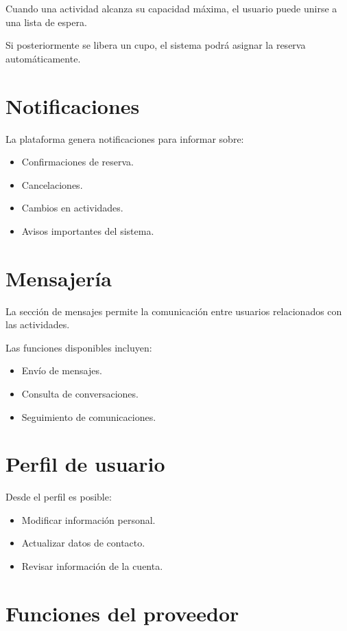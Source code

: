 \documentclass[12pt,a4paper]{article}
\begin{document}
Cuando una actividad alcanza su capacidad máxima, el usuario puede unirse a una lista de espera.

Si posteriormente se libera un cupo, el sistema podrá asignar la reserva automáticamente.

\section{Notificaciones}

La plataforma genera notificaciones para informar sobre:

\begin{itemize}
\item Confirmaciones de reserva.
\item Cancelaciones.
\item Cambios en actividades.
\item Avisos importantes del sistema.
\end{itemize}

\section{Mensajería}

La sección de mensajes permite la comunicación entre usuarios relacionados con las actividades.

Las funciones disponibles incluyen:

\begin{itemize}
\item Envío de mensajes.
\item Consulta de conversaciones.
\item Seguimiento de comunicaciones.
\end{itemize}

\section{Perfil de usuario}

Desde el perfil es posible:

\begin{itemize}
\item Modificar información personal.
\item Actualizar datos de contacto.
\item Revisar información de la cuenta.
\end{itemize}

\section{Funciones del proveedor}
\end{document}
